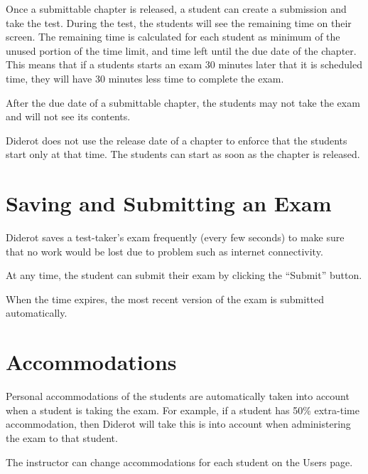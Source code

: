 \begin{cluster}
\label{grp:grm:quiz::taking-the-exam}

\begin{gram}
\label{grm:quiz::taking-the-exam}
Once a submittable chapter is released, a student can create a submission and take the test.  During the test, the students will see the remaining time on their screen.  The remaining time is calculated for each student as minimum of the unused portion of the time limit, and time left until the due date of the chapter.  This means that if a students starts an exam 30 minutes later that it is scheduled time, they will have 30 minutes less time to complete the exam.

After the due date of a submittable chapter, the students may not take the exam and will not see its contents.

Diderot does not use the release date of a chapter to enforce that the students start only at that time.  The students can start as soon as the chapter is released.

\end{gram}
\end{cluster}


\section{Saving and Submitting an Exam}
\label{sec:quiz::saving-and-submitting-an-exam}

\begin{cluster}
\label{grp:grm:quiz::saves}

\begin{gram}
\label{grm:quiz::saves}
Diderot saves a test-taker's exam frequently (every few seconds) to make sure that no work would be lost due to problem such as internet connectivity.  

At any time, the student can submit their exam by clicking the ``Submit'' button.

When the time expires, the most recent version of the exam is submitted automatically.

\end{gram}
\end{cluster}


\section{Accommodations}
\label{sec:quiz::accommodations}

\begin{cluster}
\label{grp:grm:quiz::personal}

\begin{gram}
\label{grm:quiz::personal}
Personal accommodations of the students are automatically taken into account when a student is taking the exam.  For example, if a student has 50\% extra-time accommodation, then Diderot will take this is into account when administering the exam to that student.  

The instructor can change accommodations for each student on the Users page. 

\end{gram}
\end{cluster}

